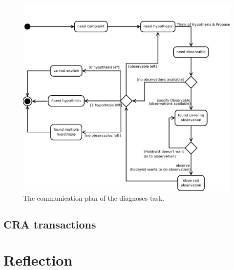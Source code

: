 \documentclass[a4paper,10pt]{article}
\begin{document}
\begin{figure}[htbp]
	\centering
		\includegraphics[width=1.00\textwidth]{communicationPlan.pdf}
	\caption{The communication plan of the diagnoses task.}
	\label{fig:communicationPlan}
\end{figure}



\subsection{CRA transactions}



\section{Reflection}
\end{document}
